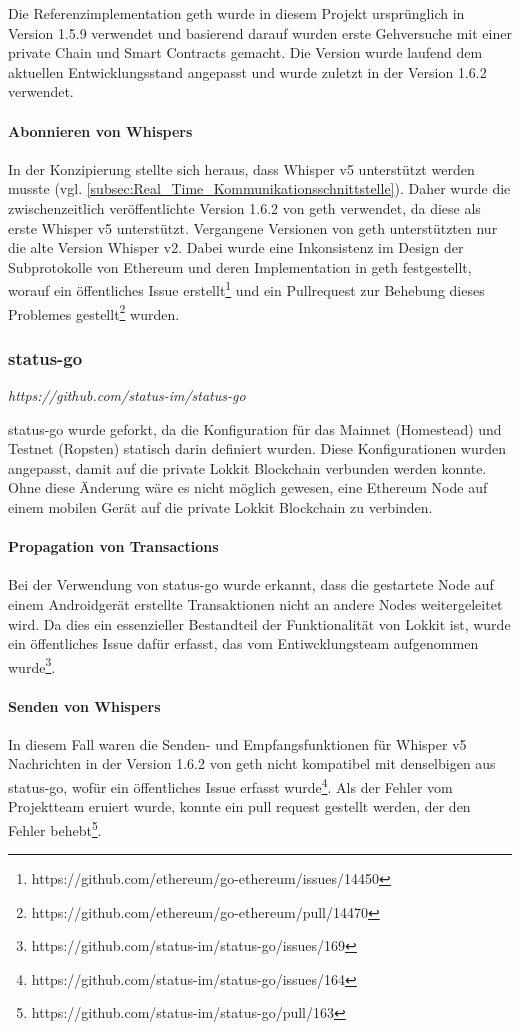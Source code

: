 Die Referenzimplementation geth wurde in diesem Projekt ursprünglich in Version 1.5.9 verwendet und basierend darauf wurden erste Gehversuche mit einer private Chain und Smart Contracts gemacht. Die Version wurde laufend dem aktuellen Entwicklungsstand angepasst und wurde zuletzt in der Version 1.6.2 verwendet.

\paragraph{Abonnieren von Whispers}
In der Konzipierung stellte sich heraus, dass Whisper v5 unterstützt werden musste (vgl. \ref{subsec:Real_Time_Kommunikationsschnittstelle}). Daher wurde die zwischenzeitlich veröffentlichte Version 1.6.2 von geth verwendet, da diese als erste Whisper v5 unterstützt. Vergangene Versionen von geth unterstützten nur die alte Version Whisper v2. Dabei wurde eine Inkonsistenz im Design der Subprotokolle von Ethereum und deren Implementation in geth festgestellt, worauf ein öffentliches Issue erstellt\footnote{https://github.com/ethereum/go-ethereum/issues/14450} und ein Pullrequest zur Behebung dieses Problemes gestellt\footnote{https://github.com/ethereum/go-ethereum/pull/14470} wurden.

\subsubsection{status-go}
\emph{https://github.com/status-im/status-go}

status-go wurde geforkt, da die Konfiguration für das Mainnet (Homestead) und Testnet (Ropsten) statisch darin definiert wurden. Diese Konfigurationen wurden angepasst, damit auf die private Lokkit Blockchain verbunden werden konnte. Ohne diese Änderung wäre es nicht möglich gewesen, eine Ethereum Node auf einem mobilen Gerät auf die private Lokkit Blockchain zu verbinden.

\paragraph{Propagation von Transactions}
Bei der Verwendung von status-go wurde erkannt, dass die gestartete Node auf einem Androidgerät erstellte Transaktionen nicht an andere Nodes weitergeleitet wird. Da dies ein essenzieller Bestandteil der Funktionalität von Lokkit ist, wurde ein öffentliches Issue dafür erfasst, das vom Entiwcklungsteam aufgenommen wurde\footnote{https://github.com/status-im/status-go/issues/169}.

\paragraph{Senden von Whispers}
In diesem Fall waren die Senden- und Empfangsfunktionen für Whisper v5 Nachrichten in der Version 1.6.2 von geth nicht kompatibel mit denselbigen aus status-go, wofür ein öffentliches Issue erfasst wurde\footnote{https://github.com/status-im/status-go/issues/164}. Als der Fehler vom Projektteam eruiert wurde, konnte ein pull request gestellt werden, der den Fehler behebt\footnote{https://github.com/status-im/status-go/pull/163}.
